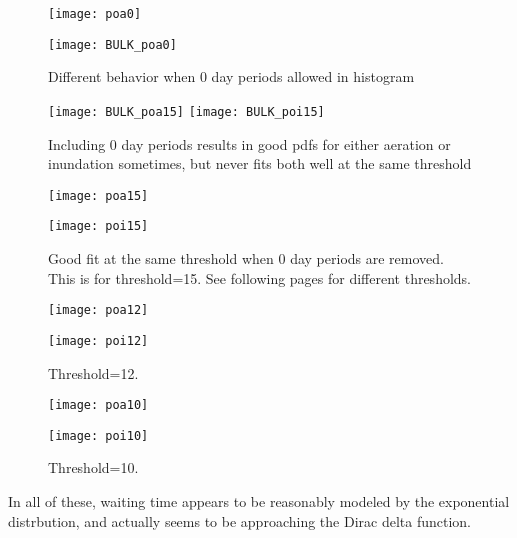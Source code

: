 \documentclass[12 pt]{article}
\begin{document}
%

\begin{figure}[!htb]
\centering
\texttt{[image: poa0]}
\end{figure}
\begin{figure}[!htb]
\centering
\texttt{[image: BULK\_poa0]}
\caption{Different behavior when 0 day periods allowed in histogram}
\end{figure}

\begin{figure}[!htb]
\centering
\texttt{[image: BULK\_poa15]}
\texttt{[image: BULK\_poi15]}
\caption{Including 0 day periods results in good pdfs for either aeration or inundation sometimes, but never fits both well at the same threshold}
\end{figure}

\begin{figure}[!htb]
\centering
\texttt{[image: poa15]}
\end{figure}
\begin{figure}[!htb]
\centering
\texttt{[image: poi15]}
\caption{Good fit at the same threshold when 0 day periods are removed. This is for threshold=15. See following pages for different thresholds.}
\end{figure}

\begin{figure}[!htb]
\centering
\texttt{[image: poa12]}
\end{figure}
\begin{figure}[!htb]
\centering
\texttt{[image: poi12]}
\caption{Threshold=12.}
\end{figure}

\begin{figure}[!htb]
\centering
\texttt{[image: poa10]}
\end{figure}
\begin{figure}[!htb]
\centering
\texttt{[image: poi10]}
\caption{Threshold=10.}
\end{figure}

\newpage
 In all of these, waiting time appears to be reasonably modeled by the exponential distrbution, and actually seems to be approaching the Dirac delta function. 
\end{document}
